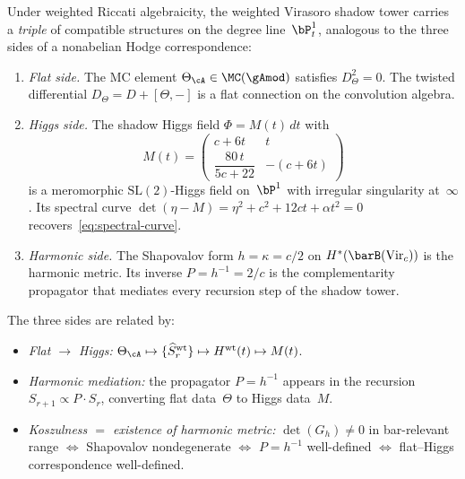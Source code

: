 \begin{theorem}
\label{thm:shadow-higgs-field}
\label{thm:nonabelian-hodge}
\ClaimStatusConditional
{}
Under weighted Riccati algebraicity, the weighted Virasoro shadow tower carries a
\emph{triple} of compatible structures on the degree
line~$\bP^1_t$, analogous to the three sides of a nonabelian
Hodge correspondence:
\begin{enumerate}[label=\textup{(\Alph*)}]
\item \emph{Flat side.}
 The MC element $\Theta_\cA \in \MC(\gAmod)$ satisfies
 $D_\Theta^2 = 0$. The twisted differential
 $D_\Theta = D + [\Theta, -]$ is a flat connection on the
 convolution algebra.
\item \emph{Higgs side.}
 The shadow Higgs field
 $\Phi = M(t)\,dt$ with
 \begin{equation}\label{eq:shadow-higgs}
 M(t) =
 \begin{pmatrix}
 c + 6t & t \\[3pt]
 \dfrac{80\,t}{5c+22} & -(c+6t)
 \end{pmatrix}
 \end{equation}
 is a meromorphic $\mathrm{SL}(2)$-Higgs field on~$\bP^1$ with
 irregular singularity at~$\infty$.
 Its spectral curve
 $\det(\eta - M) = \eta^2 + c^2 + 12ct + \alpha t^2 = 0$
 recovers~\eqref{eq:spectral-curve}.
\item \emph{Harmonic side.}
 The Shapovalov form $h = \kappa = c/2$ on
 $H^*(\barB(\mathrm{Vir}_c))$ is the harmonic metric.
 Its inverse $P = h^{-1} = 2/c$ is the complementarity
 propagator that mediates every recursion step of the
 shadow tower.
\end{enumerate}
The three sides are related by:
\begin{itemize}[nosep]
\item \emph{Flat $\to$ Higgs:}
 $\Theta_\cA \mapsto \{\widehat S^{\rm wt}_r\}
 \mapsto H^{\rm wt}(t) \mapsto M(t)$.
\item \emph{Harmonic mediation:} the propagator $P = h^{-1}$
 appears in the recursion $S_{r+1} \propto P \cdot S_r$,
 converting flat data~$\Theta$ to Higgs data~$M$.
\item \emph{Koszulness $=$ existence of harmonic metric:}
 $\det(G_h) \neq 0$ in bar-relevant range
 $\Leftrightarrow$ Shapovalov nondegenerate
 $\Leftrightarrow$ $P = h^{-1}$ well-defined
 $\Leftrightarrow$ flat--Higgs correspondence well-defined.
\end{itemize}
\end{theorem}

